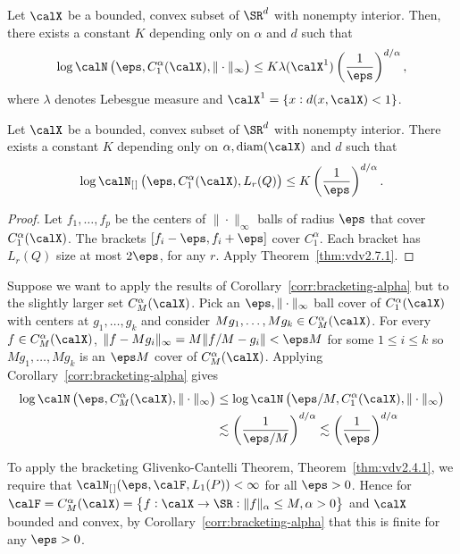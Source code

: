 \begin{theorem}
	\label{thm:vdv2.7.1}
	Let \(\calX\) be a bounded, convex subset of \(\SR^d\) with nonempty interior. Then, there exists a constant \(K\) depending only on \(\alpha\) and \(d\) such that 
	\[
		\log \calN\left(\eps,C_1^\alpha(\calX),\|\cdot\|_\infty\right) \leq K\lambda(\calX^1)\left(\frac{1}{\eps}\right)^{d/\alpha}
	,\] 
	where \(\lambda\) denotes Lebesgue measure and \(\calX^1 = \{x:d(x,\calX)<1\}\).
\end{theorem}
\begin{corollary}
    \label{corr:bracketing-alpha}
	Let \(\calX\) be a bounded, convex subset of \(\SR^d\) with nonempty interior. There exists a constant \(K\) depending only on \(\alpha,\text{diam}(\calX)\) and \(d\) such that 
	\[
		\log \calN_{[\hspace{0.1em}]}\left(\eps,C_1^\alpha(\calX),L_r(Q)\right) \leq K\left(\frac{1}{\eps}\right)^{d/\alpha}
	.\] 
\end{corollary}
\begin{proof}
	Let \(f_1,\dots,f_p\) be the centers of \(\|\cdot\|_\infty\) balls of radius \(\eps\) that cover \(C_1^\alpha(\calX)\). The brackets \([f_i-\eps,f_i+\eps]\) cover \(C_1^\alpha\). Each bracket has \(L_r(Q)\) size at most \(2\eps\), for any \(r\). Apply Theorem~\ref{thm:vdv2.7.1}.	
\end{proof}
\begin{remark*}
	Suppose we want to apply the results of Corollary~\ref{corr:bracketing-alpha} but to the slightly larger set \(C_M^\alpha(\calX)\). Pick an \(\eps,\|\cdot\|_\infty\) ball cover of \(C_1^\alpha(\calX)\) with centers at \(g_1,\dots,g_k\) and consider \(Mg_1,\dots,Mg_k \in C_M^\alpha(\calX)\). For every \(f\in C_M^\alpha(\calX)\), \(\|f-Mg_i\|_\infty = M\|f/M-g_i\| <\eps M\) for some \(1\leq i\leq k\) so \(Mg_1,\dots,Mg_k\) is an \(\eps M\) cover of \(C_M^\alpha(\calX)\). Applying Corollary~\ref{corr:bracketing-alpha} gives
	\begin{align*}
		\log\calN\left(\eps,C_M^\alpha(\calX),\|\cdot\|_\infty\right) 
		&\leq \log\calN\left(\eps/M,C_1^\alpha(\calX),\|\cdot\|_\infty\right) \\
		&\lesssim \left(\frac{1}{\eps/M}\right)^{d/\alpha} \lesssim \left(\frac{1}{\eps}\right)^{d/\alpha}
	\end{align*}
\end{remark*}
\begin{example*}
	To apply the bracketing Glivenko-Cantelli Theorem, Theorem~\ref{thm:vdv2.4.1}, we require that \(\calN_{[\hspace{0.1em}]}(\eps, \calF, L_1(P))<\infty\) for all \(\eps > 0\). Hence for \(\calF = C_M^\alpha(\calX) = \left\{f:\calX\to\SR:\|f\|_\alpha\leq M, \alpha > 0\right\}\) and \(\calX\) bounded and convex, by Corollary~\ref{corr:bracketing-alpha} that this is finite for any \(\eps > 0\).
\end{example*}
